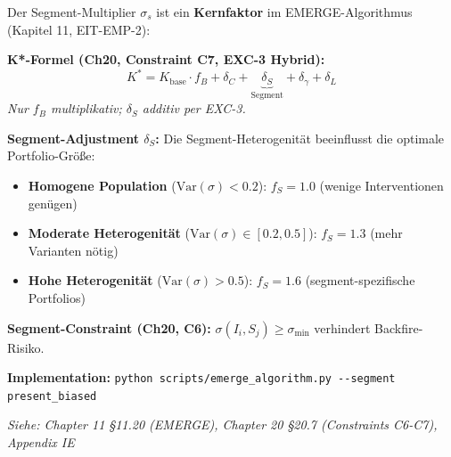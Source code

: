 \begin{tcolorbox}[colback=blue!5!white, colframe=blue!75!black,
    title=\textbf{Cross-Reference: EMERGE Algorithm \& Segment-K* (Chapter 11, 20)}]

Der Segment-Multiplier $\sigma_s$ ist ein \textbf{Kernfaktor} im EMERGE-Algorithmus (Kapitel 11, EIT-EMP-2):

\vspace{0.2cm}
\textbf{K*-Formel (Ch20, Constraint C7, EXC-3 Hybrid):}
\begin{equation*}
K^* = K_{\text{base}} \cdot f_B + \delta_C + \underbrace{\delta_S}_{\text{Segment}} + \delta_\gamma + \delta_L
\end{equation*}
\textit{Nur $f_B$ multiplikativ; $\delta_S$ additiv per EXC-3.}

\textbf{Segment-Adjustment $\delta_S$:} Die Segment-Heterogenität beeinflusst die optimale Portfolio-Größe:
\begin{itemize}[nosep]
\item \textbf{Homogene Population} ($\text{Var}(\sigma) < 0.2$): $f_S = 1.0$ (wenige Interventionen genügen)
\item \textbf{Moderate Heterogenität} ($\text{Var}(\sigma) \in [0.2, 0.5]$): $f_S = 1.3$ (mehr Varianten nötig)
\item \textbf{Hohe Heterogenität} ($\text{Var}(\sigma) > 0.5$): $f_S = 1.6$ (segment-spezifische Portfolios)
\end{itemize}

\vspace{0.2cm}
\textbf{Segment-Constraint (Ch20, C6):} $\sigma(I_i, S_j) \geq \sigma_{\min}$ verhindert Backfire-Risiko.

\vspace{0.2cm}
\textbf{Implementation:} \texttt{python scripts/emerge\_algorithm.py -{}-segment present\_biased}

\vspace{0.2cm}
\textit{Siehe: Chapter 11 §11.20 (EMERGE), Chapter 20 §20.7 (Constraints C6-C7), Appendix IE}
\end{tcolorbox}


